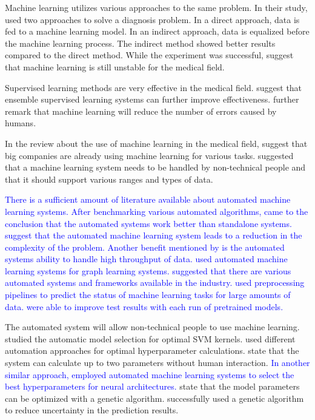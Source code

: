 \documentclass[a4paper,fleqn]{cas-dc}
\newcommand{\responsemodsm}[1]{\textcolor{blue}{#1}}
\begin{document}
Machine learning utilizes various approaches to the same problem. In their study, \cite*{ref_paper_8} used two approaches to solve a diagnosis problem. In a direct approach, data is fed to a machine learning model. In an indirect approach, data is equalized before the machine learning process. The indirect method showed better results compared to the direct method. While the experiment was successful, \citeauthor{ref_paper_8} suggest that machine learning is still unstable for the medical field.

Supervised learning methods are very effective in the medical field. \cite*{ref_paper_11} suggest that ensemble supervised learning systems can further improve effectiveness. \citeauthor{ref_paper_11} further remark that machine learning will reduce the number of errors caused by humans.

In the review about the use of machine learning in the medical field, \cite*{ref_paper_33} suggest that big companies are already using machine learning for various tasks. \citeauthor{ref_paper_33} suggested that a machine learning system needs to be handled by non-technical people and that it should support various ranges and types of data.

\responsemodsm{There is a sufficient amount of literature available about automated machine learning systems. After benchmarking various automated algorithms, \cite{ref_paper_a_5} came to the conclusion that the automated systems work better than standalone systems. \cite{ref_paper_a_1} suggest that the automated machine learning system leads to a reduction in the complexity of the problem. Another benefit mentioned by \cite{ref_paper_a_3} is the automated systems ability to handle high throughput of data. \cite{ref_paper_a_4} used automated machine learning systems for graph learning systems. \citeauthor{ref_paper_a_4} suggested that there are various automated systems and frameworks available in the industry. \cite{ref_paper_a_12} used preprocessing pipelines to predict the status of machine learning tasks for large amounts of data. \citeauthor{ref_paper_a_12} were able to improve test results with each run of pretrained models.}

The automated system will allow non-technical people to use machine learning. \cite*{ref_paper_3} studied the automatic model selection for optimal SVM kernels. \citeauthor{ref_paper_3} used different automation approaches for optimal hyperparameter calculations. \citeauthor{ref_paper_3} state that the system can calculate up to two parameters without human interaction. \responsemodsm{In another similar approach, \cite{ref_paper_a_14} employed automated machine learning systems to select the best hyperparameters for neural architectures.} \cite*{ref_paper_39} state that the model parameters can be optimized with a genetic algorithm. \citeauthor{ref_paper_39} successfully used a genetic algorithm to reduce uncertainty in the prediction results.
\end{document}
